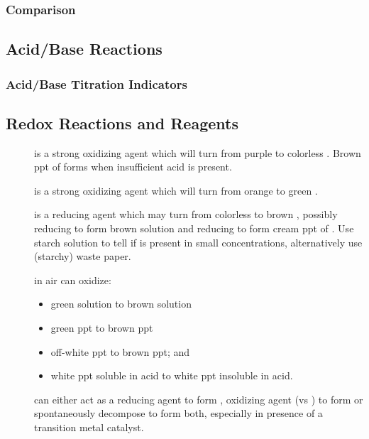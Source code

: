 \documentclass[../main]{subfiles}
\begin{document}
		\subsubsection{ Comparison}

	\subsection{Acid/Base Reactions}

		\subsubsection{Acid/Base Titration Indicators}


	\subsection{Redox Reactions and Reagents}

		\begin{description}
		\item[] is a strong oxidizing agent which will turn from purple to colorless . Brown ppt of  forms when insufficient acid is present.
		\item[] is a strong oxidizing agent which will turn from orange to green .
		\item[] is a reducing agent which may turn from colorless to brown , possibly reducing  to form brown solution and reducing  to form cream ppt of . Use starch solution to tell if  is present in small concentrations, alternatively use (starchy) waste paper.
		\item[] in air can oxidize:
		\begin{itemize}
			\item green  solution to brown  solution
			\item green  ppt to brown  ppt
			\item off-white  ppt to brown  ppt; and
			\item white  ppt soluble in acid to white  ppt insoluble in acid.
		\end{itemize}
		\item[] can either act as a reducing agent to form , oxidizing agent (vs ) to form  or spontaneously decompose to form both, especially in presence of a transition metal catalyst.
		\end{description}
\end{document}
